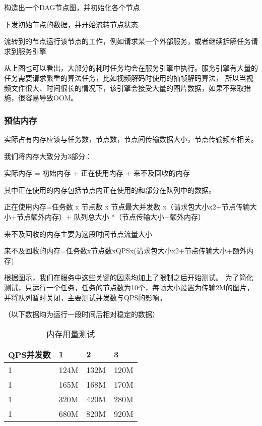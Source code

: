 构造出一个DAG节点图，并初始化各个节点

下发初始节点的数据，并开始流转节点状态

流转到的节点运行该节点的工作，例如请求某一个外部服务，或者继续拆解任务请求到服务引擎

从上图也可以看出，大部分的耗时任务均会在服务引擎中执行。服务引擎有大量的任务需要请求繁重的算法任务，比如视频解码时使用的抽帧解码算法，
所以当视频文件很大、时间很长的情况下，该引擎会接受大量的图片数据，如果不采取措施，很容易导致OOM。

\subsubsection{预估内存}

实际占有内存应该与任务数，节点数，节点间传输数据大小，节点传输频率相关\cite{qyjy}。

我们将内存大致分为3部分：

实际内存 = 初始内存 + 正在使用内存 + 来不及回收的内存

其中正在使用的内存包括节点内正在使用的和部分在队列中的数据。

正在使用内存=任务数 x 节点数 x 节点最大并发数 x（请求包大小x2+节点传输大小+节点额外内存）+ 队列总大小 *（节点传输大小+额外内存）

来不及回收的内存主要为这段时间节点流量大小

来不及回收的内存=任务数x节点数xQPSx(请求包大小x2+节点传输大小+额外内存)

根据图示，我们在服务中这些关键的因素均加上了限制之后开始测试。
为了简化测试，只运行一个任务，任务的节点数为10个，每帧大小设置为传输2M的图片，并将队列暂时关闭，主要测试并发数与QPS的影响。

（以下数据均为运行一段时间后相对稳定的数据）

\begin{table}[H]
    \centering
    \caption{内存用量测试}
    \label{tab:member_test}
    \begin{tabular}{llll}
        \toprule
        QPS\/并发数	&1	&2	&3 \\
        \midrule
        1	&124M	&132M &120M\\
        1	&165M	&168M &170M\\
        1	&320M	&420M &280M\\
        1	&680M	&820M &920M\\
        \bottomrule
    \end{tabular}
\end{table}


